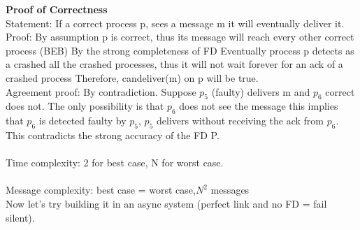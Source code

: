 \documentclass[11pt, a4paper]{article}
\begin{document}
\textbf{Proof of Correctness}\\
Statement: If a correct process p, sees a message m it will eventually deliver it.\\
Proof: By assumption p is correct, thus its message will reach every other correct process (BEB) By the strong completeness of FD Eventually process p detects as a crashed all the crashed processes, thus it will not wait forever for an ack of a crashed process Therefore, candeliver(m) on p will be true.\\
Agreement proof: By contradiction. Suppose $p_5$ (faulty) delivers m and $p_6$ correct does not. The only possibility is that $p_6$ does not see the message this implies that $p_6$ is detected faulty by $p_5$, $p_5$ delivers without receiving the ack from $p_6$. This contradicts the strong accuracy of the FD P.\\\\
Time complexity: 2 for best case, N for worst case.\\\\
Message complexity: best case = worst case,$N^2$ messages\\
Now let's try building it in an async system (perfect link and no FD = fail silent).\\
\end{document}
